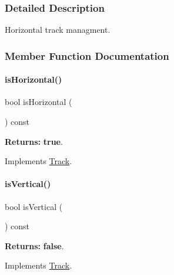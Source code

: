 \subsubsection{Detailed Description}
Horizontal track managment. 

\subsubsection{Member Function Documentation}
\mbox{\label{classKite_1_1HorizontalTrack_a21b9cefd33ae22e4c2070ad441bdd30b}} 
\paragraph{\texorpdfstring{is\+Horizontal()}{isHorizontal()}}
{\footnotesize\ttfamily bool is\+Horizontal (\begin{DoxyParamCaption}{ }\end{DoxyParamCaption}) const\hspace{0.3cm}{\ttfamily [virtual]}}

{\bfseries Returns\+:} {\bfseries true}. 

Implements \mbox{\hyperlink{classKite_1_1Track_a9d3db1f8a5aca58f8f54d291faebf873}{Track}}.

\mbox{\label{classKite_1_1HorizontalTrack_abd54544ef1710ee4b67cfb021d73446c}} 
\paragraph{\texorpdfstring{is\+Vertical()}{isVertical()}}
{\footnotesize\ttfamily bool is\+Vertical (\begin{DoxyParamCaption}{ }\end{DoxyParamCaption}) const\hspace{0.3cm}{\ttfamily [virtual]}}

{\bfseries Returns\+:} {\bfseries false}. 

Implements \mbox{\hyperlink{classKite_1_1Track_a6fa2bf0568a2b295dd7cd1f7207247d5}{Track}}.

